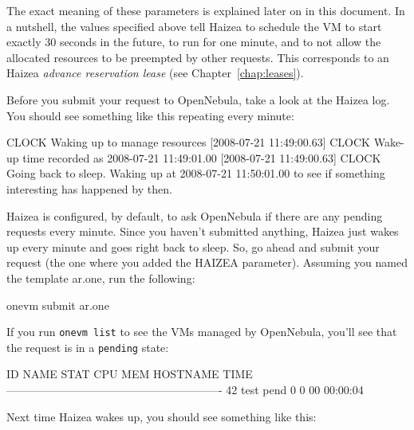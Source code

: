 The exact meaning of these parameters is explained later on in this document. In a nutshell, the values specified above tell Haizea to schedule the VM to start exactly 30 seconds in the future, to run for one minute, and to not allow the allocated resources to be preempted by other requests. This corresponds to an Haizea \emph{advance reservation lease} (see Chapter~\ref{chap:leases}).

Before you submit your request to OpenNebula, take a look at the Haizea log. You should see something like this repeating every minute:

\begin{wideshellverbatim}
[2008-07-21 11:49:00.63] CLOCK   Waking up to manage resources
[2008-07-21 11:49:00.63] CLOCK   Wake-up time recorded as 2008-07-21 11:49:01.00
[2008-07-21 11:49:00.63] CLOCK   Going back to sleep. 
                                 Waking up at 2008-07-21 11:50:01.00 
                                 to see if something interesting has happened by then.
\end{wideshellverbatim}

Haizea is configured, by default, to ask OpenNebula if there are any pending requests every minute. Since you haven't submitted anything, Haizea just wakes up every minute and goes right back to sleep. So, go ahead and submit your request (the one where you added the HAIZEA parameter). Assuming you named the template ar.one, run the following:

\begin{wideshellverbatim}
onevm submit ar.one
\end{wideshellverbatim}

If you run \texttt{onevm list} to see the VMs managed by OpenNebula, you'll see that the request is in a \texttt{pending} state:

\begin{wideshellverbatim}
  ID     NAME STAT CPU     MEM        HOSTNAME        TIME
----------------------------------------------------------
  42     test pend   0       0                 00 00:00:04
\end{wideshellverbatim}

Next time Haizea wakes up, you should see something like this:


